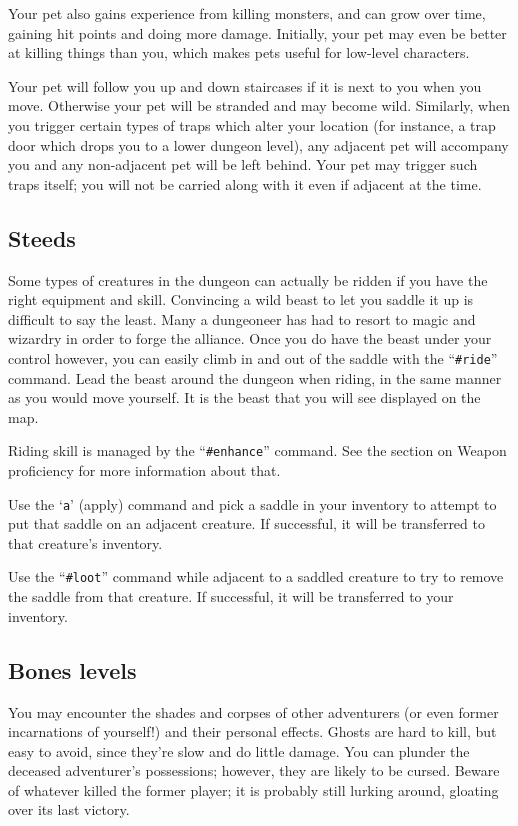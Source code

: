 Your pet also gains experience from killing monsters, and can grow
over time, gaining hit points and doing more damage.  Initially, your
pet may even be better at killing things than you, which makes pets
useful for low-level characters.

Your pet will follow you up and down staircases if it is next to you
when you move.  Otherwise your pet will be stranded and may become
wild.  Similarly, when you trigger certain types of traps which alter
your location (for instance, a trap door which drops you to a lower
dungeon level), any adjacent pet will accompany you and any non-adjacent
pet will be left behind.  Your pet may trigger such traps itself; you
will not be carried along with it even if adjacent at the time.

\subsection*{Steeds}

Some types of creatures in the dungeon can actually be ridden if you
have the right equipment and skill.  Convincing a wild beast to let
you saddle it up is difficult to say the least.  Many a dungeoneer
has had to resort to magic and wizardry in order to forge the alliance.
Once you do have the beast under your control however, you can
easily climb in and out of the saddle with the ``{\tt \#ride}'' command.  Lead
the beast around the dungeon when riding, in the same manner as
you would move yourself.  It is the beast that you will see displayed
on the map.

Riding skill is managed by the ``{\tt \#enhance}'' command.  See the section
on Weapon proficiency for more information about that.

Use the `{\tt a}' (apply) command and pick a saddle in your inventory to
attempt to put that saddle on an adjacent creature.  If successful,
it will be transferred to that creature's inventory.

Use the ``{\tt \#loot}'' command while adjacent to a saddled creature to
try to remove the saddle from that creature.  If successful, it will
be transferred to your inventory.

\subsection*{Bones levels}

You may encounter the shades and corpses of other adventurers (or even
former incarnations of yourself!) and their personal effects.  Ghosts
are hard to kill, but easy to avoid, since they're slow and do little
damage.  You can plunder the deceased adventurer's possessions;
however, they are likely to be cursed.  Beware of whatever killed the
former player; it is probably still lurking around, gloating over its
last victory.


